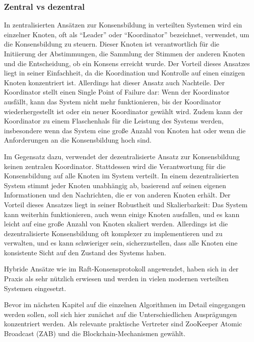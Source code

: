 \documentclass[../vs-script-first-v01.tex]{subfiles}
\begin{document}
\subsubsection{Zentral vs dezentral}

In zentralisierten Ansätzen zur Konsensbildung in verteilten Systemen wird ein einzelner Knoten, oft als \enquote{Leader} oder \enquote{Koordinator} bezeichnet, verwendet, um die Konsensbildung zu steuern. Dieser Knoten ist verantwortlich für die Initiierung der Abstimmungen, die Sammlung der Stimmen der anderen Knoten und die Entscheidung, ob ein Konsens erreicht wurde. Der Vorteil dieses Ansatzes liegt in seiner Einfachheit, da die Koordination und Kontrolle auf einen einzigen Knoten konzentriert ist. Allerdings hat dieser Ansatz auch Nachteile. Der Koordinator stellt einen Single Point of Failure dar: Wenn der Koordinator ausfällt, kann das System nicht mehr funktionieren, bis der Koordinator wiederhergestellt ist oder ein neuer Koordinator gewählt wird. Zudem kann der Koordinator zu einem Flaschenhals für die Leistung des Systems werden, insbesondere wenn das System eine große Anzahl von Knoten hat oder wenn die Anforderungen an die Konsensbildung hoch sind.

Im Gegensatz dazu, verwendet der dezentralisierte Ansatz zur Konsensbildung keinen zentralen Koordinator. Stattdessen wird die Verantwortung für die Konsensbildung auf alle Knoten im System verteilt. In einem dezentralisierten System stimmt jeder Knoten unabhängig ab, basierend auf seinen eigenen Informationen und den Nachrichten, die er von anderen Knoten erhält. Der Vorteil dieses Ansatzes liegt in seiner Robustheit und Skalierbarkeit: Das System kann weiterhin funktionieren, auch wenn einige Knoten ausfallen, und es kann leicht auf eine große Anzahl von Knoten skaliert werden. Allerdings ist die dezentralisierte Konsensbildung oft komplexer zu implementieren und zu verwalten, und es kann schwieriger sein, sicherzustellen, dass alle Knoten eine konsistente Sicht auf den Zustand des Systems haben.

Hybride Ansätze wie im Raft-Konsensprotokoll angewendet, haben sich in der Praxis als sehr nützlich erwiesen und werden in vielen modernen verteilten Systemen eingesetzt.

Bevor im nächsten Kapitel auf die einzelnen Algorithmen im Detail eingegangen werden sollen, soll sich hier zunächst auf die Unterschiedlichen Ausprägungen konzentriert werden. Als relevante praktische Vertreter sind ZooKeeper Atomic Broadcast (ZAB) und die Blockchain-Mechanismen gewählt.
\end{document}
